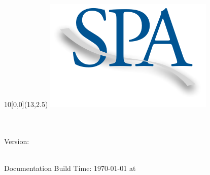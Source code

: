 
\begin{titlepage}
	\begin{textblock}{10}[0,0](13,2.5)
		\includegraphics[width=.3\textwidth]{logos/SPA_Logo.pdf}
	\end{textblock}
	\vspace*{7.5cm}
	\begin{center}
		\Huge{\mytitle}\\
		\vspace*{1.5cm}
		\huge{\mysubtitle}\\
		\huge{Version: \myversion}
	\end{center}
	\vspace{\fill}
	\begin{center}
		\large{\mycontributors}\\
		\vspace{2cm}
		\footnotesize{Documentation Build Time: \today{} at \currenttime{}}
	\end{center}
\end{titlepage}
